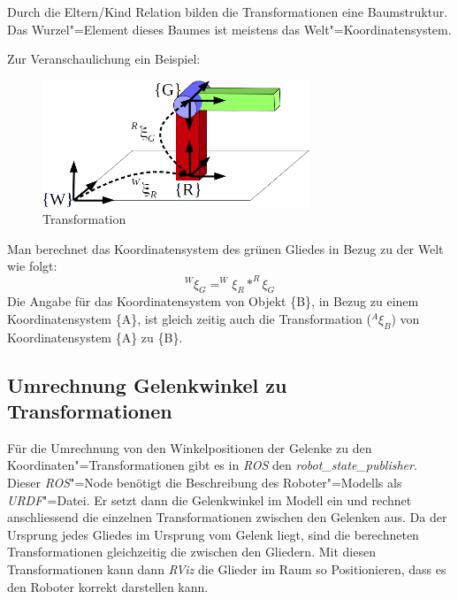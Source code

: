 Durch die Eltern/Kind Relation bilden die Transformationen eine Baumstruktur.
Das Wurzel"=Element dieses Baumes ist meistens das Welt"=Koordinatensystem.


Zur Veranschaulichung ein Beispiel:
\begin{figure}[ht!]
	\centering
	\includegraphics[width=8cm]{images/Transformation.png}
	\caption{Transformation}
	\label{Ab:transformation}
\end{figure}

Man berechnet das Koordinatensystem des grünen Gliedes in Bezug zu der Welt wie folgt:
\begin{equation}
^{W}\xi_{G} = ^{W}\xi_{R} * ^{R}\xi_{G}
\end{equation}
Die Angabe für das Koordinatensystem von Objekt \{B\}, in Bezug zu einem Koordinatensystem \{A\}, ist gleich zeitig auch die Transformation ($^{A}\xi_{B}$) von Koordinatensystem \{A\} zu \{B\}.

\subsection{Umrechnung Gelenkwinkel zu Transformationen}
Für die Umrechnung von den Winkelpositionen der Gelenke zu den Koordinaten"=Transformationen gibt es in \textit{ROS} den \textit{robot\_state\_publisher}.
Dieser \textit{ROS}"=Node benötigt die Beschreibung des Roboter"=Modells als \textit{URDF}"=Datei.
Er setzt dann die Gelenkwinkel im Modell ein und rechnet anschliessend die einzelnen Transformationen zwischen den Gelenken aus.
Da der Ursprung jedes Gliedes im Ursprung vom Gelenk liegt, sind die berechneten Transformationen gleichzeitig die zwischen den Gliedern.
Mit diesen Transformationen kann dann \textit{RViz} die Glieder im Raum so Positionieren, dass es den Roboter korrekt darstellen kann.






